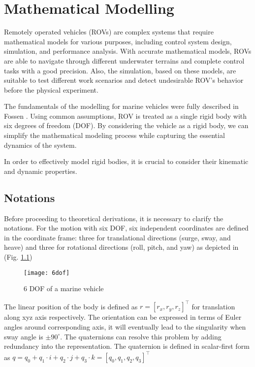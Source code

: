 \chapter{Mathematical Modelling}
\label{chap:mat}


    Remotely operated vehicles (ROVs) are complex systems that require mathematical models for various purposes, 
    including control system design, simulation, and performance analysis. With accurate mathematical models, 
    ROVs are able to navigate through different underwater terrains and complete control tasks with a good 
    precision. Also, the simulation, based on these models, are suitable to test different work scenarios and 
    detect undesirable ROV's behavior before the physical experiment.   
    
    The fundamentals of the modelling for marine vehicles were fully described in Fossen \cite{fossen:guidance}.
    Using common assumptions, ROV is treated as a single rigid body with six degrees of freedom (DOF).
    By considering the vehicle as a rigid body, we can simplify the mathematical modeling process while capturing the essential dynamics 
    of the system.

    In order to effectively model rigid bodies, it is crucial to consider their kinematic and dynamic properties.
\section{Notations}

    Before proceeding to theoretical derivations, it is necessary to clarify the notations.
    For the motion with six DOF, six independent coordinates are defined in the coordinate frame: 
    three for translational directions (surge, sway, and heave) and three for rotational directions 
    (roll, pitch, and yaw) as depicted in (Fig. \ref{image:6dof})

    \begin{figure}[H]
        \centering\texttt{[image: 6dof]}
        \caption{6 DOF of a marine vehicle}
        \label{image:6dof}
    \end{figure}

    The linear position of the body is defined as $r = [r_x, r_y, r_z]^\top$ for translation along xyz axis respectively.
    The orientation can be expressed in terms of Euler angles around corresponding axis, it will eventually lead 
    to the singularity when sway angle is $± 90^{\circ}$. 
    The quaternions can resolve this problem by adding redundancy into the representation. 
    The quaternion is defined in scalar-first form as 
    $q = q_0 + q_1\cdot i + q_2\cdot j + q_3\cdot k = [q_0, q_1, q_2, q_3]^\top$

